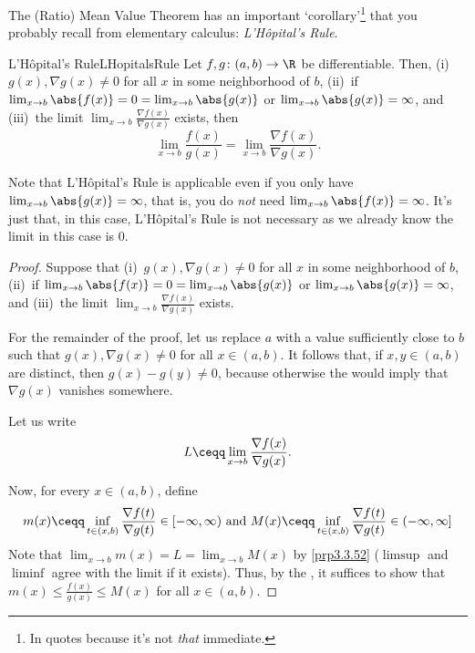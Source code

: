 The (Ratio) Mean Value Theorem has an important `corollary'\footnote{In quotes because it's not \emph{that} immediate.} that you probably recall from elementary calculus:  \emph{L'Hôpital's Rule}.
\begin{thm}{L'Hôpital's Rule}{LHopitalsRule}
Let $f,g\colon (a,b)\rightarrow \R$ be differentiable.  Then, (i)~$g(x),\nabla g(x)\neq 0$ for all $x$ in some neighborhood of $b$, (ii)~if $\lim _{x\to b}\abs{f(x)}=0=\lim _{x\to b}\abs{g(x)}$ or $\lim _{x\to b}\abs{g(x)}=\infty$, and (iii)~the limit $\lim _{x\to b}\frac{\nabla f(x)}{\nabla g(x)}$ exists, then
\begin{equation}
\lim _{x\to b}\frac{f(x)}{g(x)}=\lim _{x\to b}\frac{\nabla f(x)}{\nabla g(x)}.
\end{equation}
\begin{rmk}
Note that L'Hôpital's Rule is applicable even if you only have $\lim _{x\to b}\abs{g(x)}=\infty$, that is, you do \emph{not} need $\lim _{x\to b}\abs{f(x)}=\infty$.  It's just that, in this case, L'Hôpital's Rule is not necessary as we already know the limit in this case is $0$.
\end{rmk}
\begin{proof}
Suppose that (i)~$g(x),\nabla g(x)\neq 0$ for all $x$ in some neighborhood of $b$, (ii)~if $\lim _{x\to b}\abs{f(x)}=0=\lim _{x\to b}\abs{g(x)}$ or $\lim _{x\to b}\abs{g(x)}=\infty$, and (iii)~the limit $\lim _{x\to b}\frac{\nabla f(x)}{\nabla g(x)}$ exists.

For the remainder of the proof, let us replace $a$ with a value sufficiently close to $b$ such that $g(x),\nabla g(x)\neq 0$ for all $x\in (a,b)$.  It follows that, if $x,y\in (a,b)$ are distinct, then $g(x)-g(y)\neq 0$, because otherwise the  would imply that $\nabla g(x)$ vanishes somewhere.

Let us write
\begin{equation}
L\ceqq \lim _{x\to b}\frac{\nabla f(x)}{\nabla g(x)}.
\end{equation}

Now, for every $x\in (a,b)$, define
\begin{equation}
m(x)\ceqq \inf _{t\in (x,b)}\frac{\nabla f(t)}{\nabla g(t)}\in [-\infty ,\infty )\text{ and }M(x)\ceqq \inf _{t\in (x,b)}\frac{\nabla f(t)}{\nabla g(t)}\in (-\infty ,\infty ]
\end{equation}
Note that $\lim _{x\to b}m(x)=L=\lim _{x\to b}M(x)$ by \cref{prp3.3.52} ($\limsup$ and $\liminf$ agree with the limit if it exists).  Thus, by the , it suffices to show that $m(x)\leq \frac{f(x)}{g(x)}\leq M(x)$ for all $x\in (a,b)$.


\end{proof}
\end{thm}
